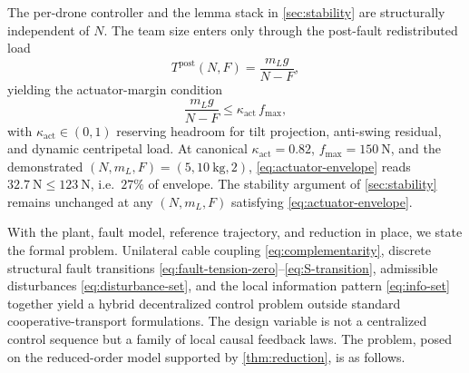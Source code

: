 \documentclass[lettersize,journal]{IEEEtran}
\begin{document}
The per-drone controller and the lemma stack in \cref{sec:stability} are structurally independent of $N$. The team size enters only through the post-fault redistributed load
\begin{equation}
  T^{\mathrm{post}}(N,F) = \frac{m_L g}{N-F},
   \label{eq:tension-postfault-N}
\end{equation}
yielding the actuator-margin condition
\begin{equation}
  \frac{m_L g}{N-F} \le \kappa_{\mathrm{act}}\,f_{\max},
   \label{eq:actuator-envelope}
\end{equation}
with $\kappa_{\mathrm{act}}\in(0,1)$ reserving headroom for tilt projection, anti-swing residual, and dynamic centripetal load. At canonical $\kappa_{\mathrm{act}}=0.82$, $f_{\max}=\SI{150}{\newton}$, and the demonstrated $(N,m_L,F)=(5,\SI{10}{\kilo\gram},2)$, \eqref{eq:actuator-envelope} reads $\SI{32.7}{\newton}\le\SI{123}{\newton}$, i.e.\ $27\%$ of envelope. The stability argument of \cref{sec:stability} remains unchanged at any $(N,m_L,F)$ satisfying \eqref{eq:actuator-envelope}.
\label{sec:formal-problem}

With the plant, fault model, reference trajectory, and reduction in place, we state the formal problem. Unilateral cable coupling \eqref{eq:complementarity}, discrete structural fault transitions \eqref{eq:fault-tension-zero}--\eqref{eq:S-transition}, admissible disturbances \eqref{eq:disturbance-set}, and the local information pattern \eqref{eq:info-set} together yield a hybrid decentralized control problem outside standard cooperative-transport formulations. The design variable is not a centralized control sequence but a family of local causal feedback laws. The problem, posed on the reduced-order model supported by \cref{thm:reduction}, is as follows.
\end{document}
